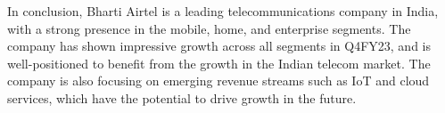 In conclusion, Bharti Airtel is a leading telecommunications company in India, with a strong presence in the mobile, home, and enterprise segments. The company has shown impressive growth across all segments in Q4FY23, and is well-positioned to benefit from the growth in the Indian telecom market. The company is also focusing on emerging revenue streams such as IoT and cloud services, which have the potential to drive growth in the future.
